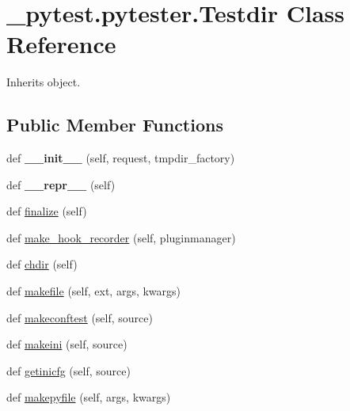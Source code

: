 \hypertarget{class__pytest_1_1pytester_1_1_testdir}{}\section{\+\_\+pytest.\+pytester.\+Testdir Class Reference}
\label{class__pytest_1_1pytester_1_1_testdir}


Inherits object.

\subsection*{Public Member Functions}
\begin{DoxyCompactItemize}
\item 
\mbox{\label{class__pytest_1_1pytester_1_1_testdir_a8116d17b9db30177438e5fbd9da2c29e}} 
def {\bfseries \+\_\+\+\_\+init\+\_\+\+\_\+} (self, request, tmpdir\+\_\+factory)
\item 
\mbox{\label{class__pytest_1_1pytester_1_1_testdir_a482ec8693c45a7461ba78c3c015df01f}} 
def {\bfseries \+\_\+\+\_\+repr\+\_\+\+\_\+} (self)
\item 
def \hyperlink{class__pytest_1_1pytester_1_1_testdir_a3635442c6e4b98ee70510179bb4a636f}{finalize} (self)
\item 
def \hyperlink{class__pytest_1_1pytester_1_1_testdir_a3cd564d773658c4b44e8edf2bcd1a92b}{make\+\_\+hook\+\_\+recorder} (self, pluginmanager)
\item 
def \hyperlink{class__pytest_1_1pytester_1_1_testdir_ad5ebca0ac988f93cd0009dd1aaf8efc7}{chdir} (self)
\item 
def \hyperlink{class__pytest_1_1pytester_1_1_testdir_a8f4d8c98a81eaeb7b78e549625c8b9a1}{makefile} (self, ext, args, kwargs)
\item 
def \hyperlink{class__pytest_1_1pytester_1_1_testdir_a99f7e222aba80cb2c8fc8b67d0b9a980}{makeconftest} (self, source)
\item 
def \hyperlink{class__pytest_1_1pytester_1_1_testdir_a7211f0bf717acac6697a052de659083f}{makeini} (self, source)
\item 
def \hyperlink{class__pytest_1_1pytester_1_1_testdir_a653f63e4b82683b8c4cf119581050d53}{getinicfg} (self, source)
\item 
def \hyperlink{class__pytest_1_1pytester_1_1_testdir_af71295b49819f3feb59496921e6e1261}{makepyfile} (self, args, kwargs)

\end{DoxyCompactItemize}
